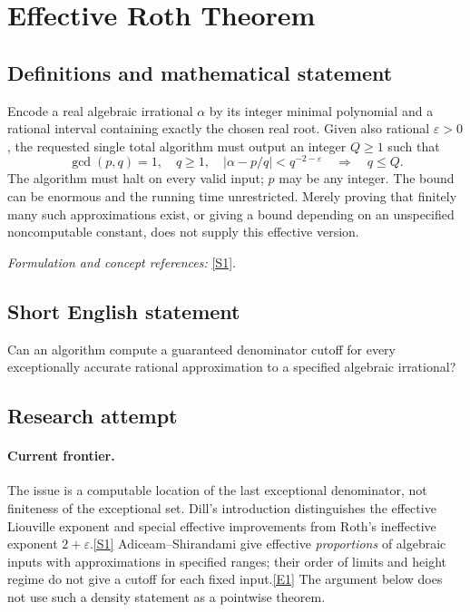 \documentclass[11pt,a4paper]{article}
\newcommand{\eps}{\varepsilon}
\newcommand{\sref}[2]{\hyperlink{source:#1:#2}{[S#2]}}
\newcommand{\eref}[2]{\hyperlink{extra:#1:#2}{[E#2]}}
\newif\ifshowcatalogue
\newcommand{\cataloguescope}[1]{\ifshowcatalogue
 \paragraph{Exact scope in the supplied catalogue.}
 \begin{quote}\small #1\end{quote}\fi}
\begin{document}
\setcounter{section}{0}
\clearpage
\section*{\texorpdfstring{Effective Roth Theorem}{Effective Roth Theorem}}\label{statement}
\subsection{Definitions and mathematical statement}
Encode a real algebraic irrational $\alpha$ by its integer minimal polynomial and a rational interval containing exactly the chosen real root. Given also rational $\eps>0$, the requested single total algorithm must output an integer $Q\ge1$ such that
\[
 \gcd(p,q)=1,\quad q\ge1,\quad
 |\alpha-p/q|<q^{-2-\eps}\quad\Longrightarrow\quad q\le Q.
\]
The algorithm must halt on every valid input; $p$ may be any integer. The bound can be enormous and the running time unrestricted. Merely proving that finitely many such approximations exist, or giving a bound depending on an unspecified noncomputable constant, does not supply this effective version.
\par\smallskip\textit{Formulation and concept references:} \sref{statement}{1}.
\cataloguescope{There exists one total computable algorithm which, given a real algebraic irrational alpha by its integer minimal polynomial and a rational isolating interval, and a positive rational epsilon, returns an integer Q>=1 such that every reduced rational p/q, with p an integer and q>=1 an integer, satisfying |alpha-p/q|<q\textasciicircum{}(-2-epsilon) has q<=Q. The algorithm must halt with this guarantee on every valid input. No time, space, practical-size or software-implementation requirement is imposed.}
\subsection{Short English statement}
Can an algorithm compute a guaranteed denominator cutoff for every exceptionally accurate rational approximation to a specified algebraic irrational?
\subsection{Research attempt}

\paragraph{Current frontier.}
The issue is a computable location of the last exceptional denominator, not
finiteness of the exceptional set. Dill's introduction distinguishes the
effective Liouville exponent and special effective improvements from Roth's
ineffective exponent $2+\eps$.\sref{statement}{1} Adiceam--Shirandami give effective
\emph{proportions} of algebraic inputs with approximations in specified
ranges; their order of limits and height regime do not give a cutoff for
each fixed input.\eref{statement}{1} The argument below does not use such a density
statement as a pointwise theorem.
\end{document}
